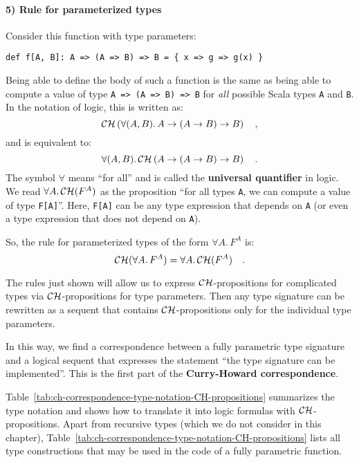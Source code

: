 \paragraph{5) Rule for parameterized types}

Consider this function with type parameters:
\begin{lstlisting}
def f[A, B]: A => (A => B) => B = { x => g => g(x) }
\end{lstlisting}
Being able to define the body of such a function is the same as being
able to compute a value of type \lstinline!A => (A => B) => B! for
\emph{all} possible Scala types \lstinline!A! and \lstinline!B!.
In the notation of logic, this is written as:
\[
{\cal CH}\left(\forall(A,B).\,A\rightarrow(A\rightarrow B)\rightarrow B\right)\quad,
\]
and is equivalent to:
\[
\forall(A,B).\,{\cal CH}\left(A\rightarrow(A\rightarrow B)\rightarrow B\right)\quad.
\]
The symbol $\forall$ means \textsf{``}for all\textsf{''} and is called the \textbf{universal
quantifier} in logic. We read $\forall A.\,{\cal CH}(F^{A})$ as the
proposition \textsf{``}for all types \lstinline!A!, we can compute a value
of type \lstinline!F[A]!\textsf{''}. Here, \lstinline!F[A]! can be any type
expression that depends on \lstinline!A! (or even a type expression
that does not depend on \lstinline!A!).

So, the rule for parameterized types of the form $\forall A.\,F^{A}$
is:
\[
{\cal CH}(\forall A.\,F^{A})=\forall A.\,{\cal CH}(F^{A})\quad.
\]

The rules just shown will allow us to express ${\cal CH}$-propositions
for complicated types via ${\cal CH}$-propositions for type parameters.
Then any type signature can be rewritten as a sequent that contains
${\cal CH}$-propositions only for the individual type parameters. 

In this way, we find a correspondence between a fully parametric type
signature and a logical sequent that expresses the statement \textsf{``}the
type signature can be implemented\textsf{''}. This is the first part of the
\textbf{Curry-Howard correspondence}.

Table~\ref{tab:ch-correspondence-type-notation-CH-propositions}
summarizes the type notation and shows how to translate it into logic
formulas with ${\cal CH}$-propositions. Apart from recursive types
(which we do not consider in this chapter), Table~\ref{tab:ch-correspondence-type-notation-CH-propositions}
lists all type constructions that may be used in the code of a fully
parametric function.

